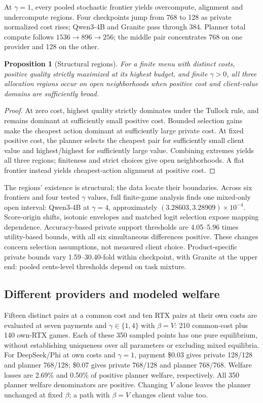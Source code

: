 \documentclass[sigconf,anonymous,nonacm]{acmart}
\newtheorem{proposition}{Proposition}
\begin{document}
At $\gamma=1$, every pooled stochastic frontier yields overcompute, alignment and undercompute regions. Four checkpoints jump from 768 to 128 as private normalized cost rises; Qwen3-4B and Granite pass through 384. Planner total compute follows $1536\to896\to256$; the middle pair concentrates 768 on one provider and 128 on the other.

\begin{proposition}[Structural regions]\label{prop:regions}
For a finite menu with distinct costs, positive quality strictly maximized at its highest budget, and finite $\gamma>0$, all three allocation regions occur on open neighborhoods when positive cost and client-value domains are sufficiently broad.
\end{proposition}
\begin{proof}
At zero cost, highest quality strictly dominates under the Tullock rule, and remains dominant at sufficiently small positive cost. Bounded selection gains make the cheapest action dominant at sufficiently large private cost. At fixed positive cost, the planner selects the cheapest pair for sufficiently small client value and highest/highest for sufficiently large value. Combining extremes yields all three regions; finiteness and strict choices give open neighborhoods. A flat frontier instead yields cheapest-action alignment at positive cost.
\end{proof}
The regions' existence is structural; the data locate their boundaries. Across six frontiers and four tested $\gamma$ values, full finite-game analysis finds one mixed-only open interval: Qwen3-4B at $\gamma=4$, approximately $(3.28603,3.28909)\times10^{-4}$. Score-origin shifts, isotonic envelopes and matched logit selection expose mapping dependence. Accuracy-based private support thresholds are 4.05--5.96 times utility-based bounds, with all six simultaneous differences positive. These changes concern selection assumptions, not measured client choice. Product-specific private bounds vary 1.59--30.40-fold within checkpoint, with Granite at the upper end: pooled cents-level thresholds depend on task mixture.

\subsection{Different providers and modeled welfare}
Fifteen distinct pairs at a common cost and ten RTX pairs at their own costs are evaluated at seven payments and $\gamma\in\{1,4\}$ with $\beta=V$: 210 common-cost plus 140 own-RTX games. Each of these 350 sampled points has one pure equilibrium, without establishing uniqueness over all parameters or excluding mixed equilibria. For DeepSeek/Phi at own costs and $\gamma=1$, payment \$0.03 gives private 128/128 and planner 768/128; \$0.07 gives private 768/128 and planner 768/768. Welfare losses are 2.69\% and 0.50\% of positive planner welfare, respectively. All 350 planner welfare denominators are positive. Changing $V$ alone leaves the planner unchanged at fixed $\beta$; a path with $\beta=V$ changes client value too.
\end{document}
